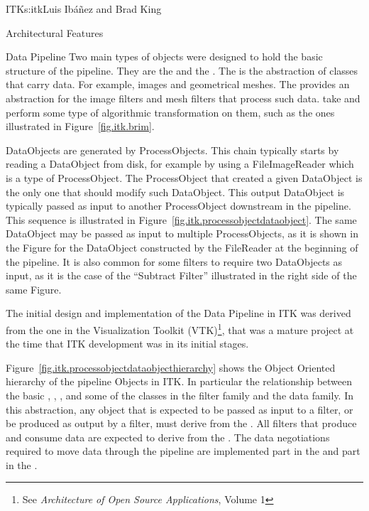 \begin{aosachapter}{ITK}{s:itk}{Luis Ib\'{a}\~{n}ez and Brad King}
\begin{aosasect1}{Architectural Features}
\begin{aosasect2}{Data Pipeline}
Two main types of objects were designed to hold the basic structure of the
pipeline.  They are the  and the . The
 is the abstraction of classes that carry data. For example,
images and geometrical meshes. The  provides an abstraction
for the image filters and mesh filters that process such data.
 take  and perform some type of
algorithmic transformation on them, such as the ones illustrated
in Figure~\ref{fig.itk.brim}.


DataObjects are generated by ProcessObjects. This chain typically starts by
reading a DataObject from disk, for example by using a FileImageReader which is
a type of ProcessObject. The ProcessObject that created a given DataObject is
the only one that should modify such DataObject. This output DataObject is
typically passed as input to another ProcessObject downstream in the pipeline.
This sequence is illustrated in Figure~\ref{fig.itk.processobjectdataobject}.
The same DataObject may be passed as input to multiple ProcessObjects, as it is
shown in the Figure for the DataObject constructed by the FileReader at the
beginning of the pipeline. It is also common for some filters to require two
DataObjects as input, as it is the case of the ``Subtract Filter'' illustrated
in the right side of the same Figure.

The initial design and implementation of the Data Pipeline in ITK was derived
from the one in the Visualization Toolkit (VTK)\footnote{See \emph{Architecture
of Open Source Applications}, Volume 1}, that was a mature project at the time
that ITK development was in its initial stages.

Figure~\ref{fig.itk.processobjectdataobjecthierarchy} shows the Object Oriented
hierarchy of the pipeline Objects in ITK. In particular the relationship
between the basic , , , and
some of the classes in the filter family and the data family. In this
abstraction, any object that is expected to be passed as input to a filter, or
be produced as output by a filter, must derive from the . All
filters that produce and consume data are expected to derive from the
. The data negotiations required to move data through the
pipeline are implemented part in the  and part in the
.


\end{aosasect2}
\end{aosasect1}
\end{aosachapter}
